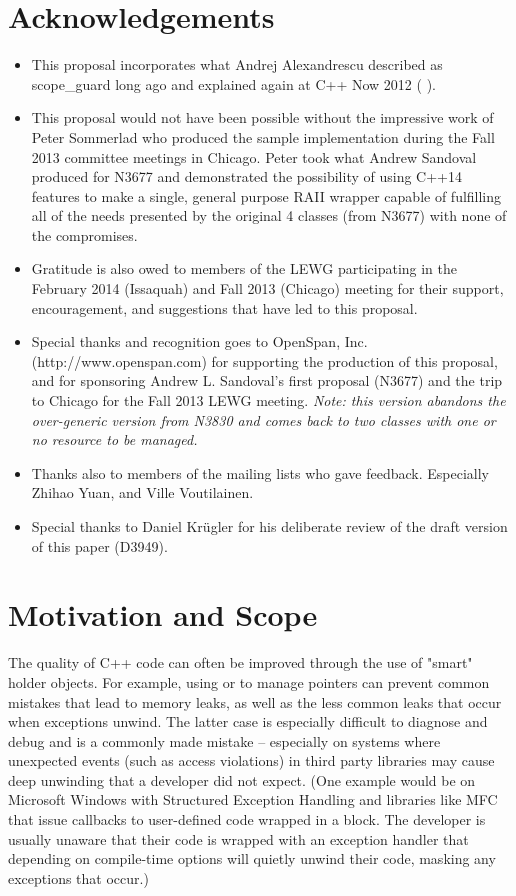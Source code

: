 \documentclass[ebook,11pt,article]{memoir}
\begin{document}
\chapter{Acknowledgements}
\begin{itemize}
\item This proposal incorporates what Andrej Alexandrescu described as scope_guard long ago and explained again at C++ Now 2012 (%
).
\item This proposal would not have been possible without the impressive work of Peter Sommerlad who produced the sample implementation during the Fall 2013 committee meetings in Chicago.  Peter took what Andrew Sandoval produced for N3677 and demonstrated the possibility of using C++14 features to make a single, general purpose RAII wrapper capable of fulfilling all of the needs presented by the original 4 classes (from N3677) with none of the compromises.
\item Gratitude is also owed to members of the LEWG participating in the February 2014 (Issaquah) and Fall 2013 (Chicago) meeting for their support, encouragement, and suggestions that have led to this proposal.
\item Special thanks and recognition goes to OpenSpan, Inc. (http://www.openspan.com) for supporting the production of this proposal, and for sponsoring Andrew L. Sandoval's first proposal (N3677) and the trip to Chicago for the Fall 2013 LEWG meeting. \emph{Note: this version abandons the over-generic version from N3830 and comes back to two classes with one or no resource to be managed.}
\item Thanks also to members of the mailing lists who gave feedback. Especially Zhihao Yuan, and Ville Voutilainen.
\item Special thanks to Daniel Kr\"ugler for his deliberate review of the draft version of this paper (D3949).
\end{itemize}

\chapter{Motivation and Scope}
The quality of C++ code can often be improved through the use of "smart" holder objects.  For example, using  or  to manage pointers can prevent common mistakes that lead to memory leaks, as well as the less common leaks that occur when exceptions unwind.  The latter case is especially difficult to diagnose and debug and is a commonly made mistake -- especially on systems where unexpected events (such as access violations) in third party libraries may cause deep unwinding that a developer did not expect.  (One example would be on Microsoft Windows with Structured Exception Handling and libraries like MFC that issue callbacks to user-defined code wrapped in a  block.  The developer is usually unaware that their code is wrapped with an exception handler that depending on compile-time options will quietly unwind their code, masking any exceptions that occur.)
\end{document}
